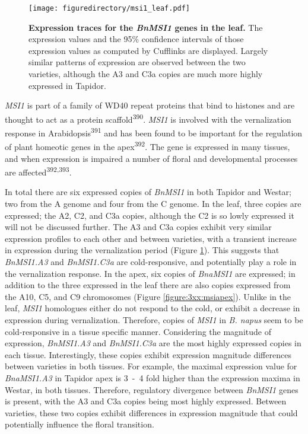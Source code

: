\documentclass[12pt,]{book}
\begin{document}
\begin{figure}[htbp]
\centering
\texttt{[image: figuredirectory/msi1\_leaf.pdf]}
\caption{\textbf{Expression traces for the \emph{BnMSI1} genes in the
leaf.} The expression values and the 95\% confidence intervals of those
expression values as computed by Cufflinks are displayed. Largely
similar patterns of expression are observed between the two varieties,
although the A3 and C3a copies are much more highly expressed in
Tapidor.}\label{figure:3xx:fie1msi1leaf}
\end{figure}

\emph{MSI1} is part of a family of WD40 repeat proteins that bind to
histones and are thought to act as a protein
scaffold\textsuperscript{390}. \emph{MSI1} is involved with the
vernalization response in Arabidopsis\textsuperscript{391} and has been
found to be important for the regulation of plant homeotic genes in the
apex\textsuperscript{392}. The gene is expressed in many tissues, and
when expression is impaired a number of floral and developmental
processes are affected\textsuperscript{392,393}.

In total there are six expressed copies of \emph{BnMSI1} in both Tapidor
and Westar; two from the A genome and four from the C genome. In the
leaf, three copies are expressed; the A2, C2, and C3a copies, although
the C2 is so lowly expressed it will not be discussed further. The A3
and C3a copies exhibit very similar expression profiles to each other
and between varieties, with a transient increase in expression during
the vernalization period (Figure \ref{figure:3xx:fie1msi1leaf}). This
suggests that \emph{BnMSI1.A3} and \emph{BnMSI1.C3a} are
cold-responsive, and potentially play a role in the vernalization
response. In the apex, six copies of \emph{BnaMSI1} are expressed; in
addition to the three expressed in the leaf there are also copies
expressed from the A10, C5, and C9 chromosomes (Figure
\ref{figure:3xx:msiapex}). Unlike in the leaf, \emph{MSI1} homologues
either do not respond to the cold, or exhibit a decrease in expression
during vernalization. Therefore, copies of \emph{MSI1} in \emph{B.
napus} seem to be cold-responsive in a tissue specific manner.
Considering the magnitude of expression, \emph{BnMSI1.A3} and
\emph{BnMSI1.C3a} are the most highly expressed copies in each tissue.
Interestingly, these copies exhibit expression magnitude differences
between varieties in both tissues. For example, the maximal expression
value for \emph{BnaMSI1.A3} in Tapidor apex is 3~-~4 fold higher than
the expression maxima in Westar, in both tissues. Therefore, regulatory
divergence between \emph{BnMSI1} genes is present, with the A3 and C3a
copies being most highly expressed. Between varieties, these two copies
exhibit differences in expression magnitude that could potentially
influence the floral transition.
\end{document}
